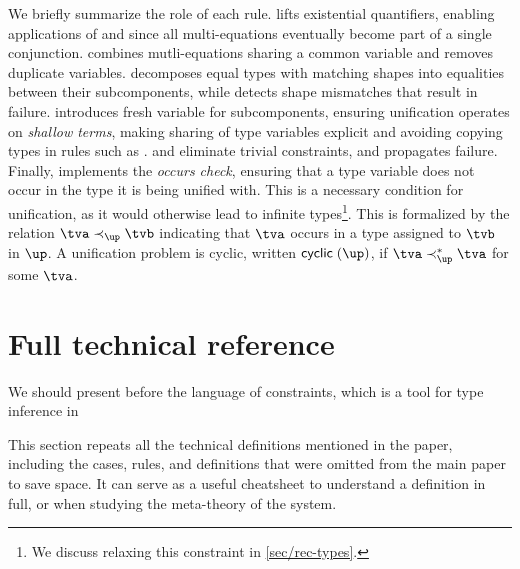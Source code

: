 \documentclass[acmsmall,screen,nonacm,review]{acmart}
\begin{document}

We briefly summarize the role of each rule.  lifts existential
quantifiers, enabling applications of  and  since
all multi-equations eventually become part of a single conjunction.
 combines mutli-equations sharing a common variable and
 removes duplicate variables.  decomposes equal
types with matching shapes into equalities between their subcomponents, while
 detects shape mismatches that result in failure. 
introduces fresh variable for subcomponents, ensuring unification operates on
\emph{shallow terms}, making sharing of type variables explicit and avoiding
copying types in rules such as .  and
 eliminate trivial constraints, and  propagates
failure.
%
Finally,  implements the \emph{occurs check}, ensuring that a
type variable does not occur in the type it is being unified with. This is a
necessary condition for unification, as it would otherwise lead to infinite
types\footnote{We discuss relaxing this constraint in \cref{sec/rec-types}.}.
This is formalized by the relation $\tv \prec_\up \tvb$ indicating that $\tv$
occurs in a type assigned to $\tvb$ in $\up$. A unification problem is cyclic,
written $\cyclic \up$, if $\tv \prec_\up^* \tv$ for some $\tv$.

\clearpage
\section{Full technical reference}
\label{appendix:figures}
\label{app:full-reference}

\Xdidier
  {We should present \OML before the language of constraints, which is a
  tool for type inference in \OML}

This section repeats all the technical definitions mentioned in the paper,
including the cases, rules, and definitions that were omitted from the main
paper to save space. It can serve as a useful cheatsheet to understand a
definition in full, or when studying the meta-theory of the system.
\end{document}
